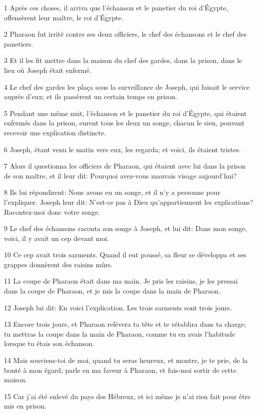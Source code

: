 \par 1 Après ces choses, il arriva que l'échanson et le panetier du roi d'Égypte, offensèrent leur maître, le roi d'Égypte.
\par 2 Pharaon fut irrité contre ses deux officiers, le chef des échansons et le chef des panetiers.
\par 3 Et il les fit mettre dans la maison du chef des gardes, dans la prison, dans le lieu où Joseph était enfermé.
\par 4 Le chef des gardes les plaça sous la surveillance de Joseph, qui faisait le service auprès d'eux; et ils passèrent un certain temps en prison.
\par 5 Pendant une même nuit, l'échanson et le panetier du roi d'Égypte, qui étaient enfermés dans la prison, eurent tous les deux un songe, chacun le sien, pouvant recevoir une explication distincte.
\par 6 Joseph, étant venu le matin vers eux, les regarda; et voici, ils étaient tristes.
\par 7 Alors il questionna les officiers de Pharaon, qui étaient avec lui dans la prison de son maître, et il leur dit: Pourquoi avez-vous mauvais visage aujourd'hui?
\par 8 Ils lui répondirent: Nous avons eu un songe, et il n'y a personne pour l'expliquer. Joseph leur dit: N'est-ce pas à Dieu qu'appartiennent les explications? Racontez-moi donc votre songe.
\par 9 Le chef des échansons raconta son songe à Joseph, et lui dit: Dans mon songe, voici, il y avait un cep devant moi.
\par 10 Ce cep avait trois sarments. Quand il eut poussé, sa fleur se développa et ses grappes donnèrent des raisins mûrs.
\par 11 La coupe de Pharaon était dans ma main. Je pris les raisins, je les pressai dans la coupe de Pharaon, et je mis la coupe dans la main de Pharaon.
\par 12 Joseph lui dit: En voici l'explication. Les trois sarments sont trois jours.
\par 13 Encore trois jours, et Pharaon relèvera ta tête et te rétablira dans ta charge; tu mettras la coupe dans la main de Pharaon, comme tu en avais l'habitude lorsque tu étais son échanson.
\par 14 Mais souviens-toi de moi, quand tu seras heureux, et montre, je te prie, de la bonté à mon égard; parle en ma faveur à Pharaon, et fais-moi sortir de cette maison.
\par 15 Car j'ai été enlevé du pays des Hébreux, et ici même je n'ai rien fait pour être mis en prison.

